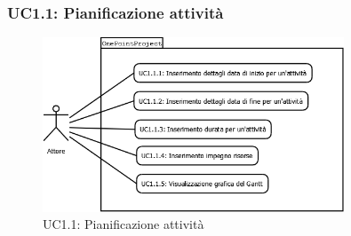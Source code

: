 \subsubsection[UC1.1: Pianificazione attivit\`{a}]{UC1.1: Pianificazione attivit\`{a}}
\begin{figure}[H]
\begin{center}
\includegraphics[width=0.80\textwidth]{img/UC/UC1.1.png}
\caption{UC1.1: Pianificazione attivit\`{a}}
\label{fig:UC1.1}
\end{center}
\end{figure}

